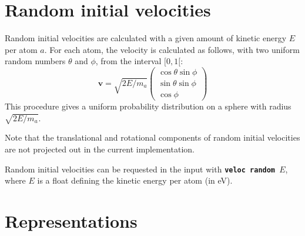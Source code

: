 \documentclass[a4paper,11pt,DIV=15,openany,twoside=false]{scrbook}
\newcommand{\sharc}{\textsc{Sharc}}
\newcommand{\ttt}[1]{\textbf{\texttt{#1}}}
\newcommand{\VEC}[1]{\ensuremath{\mathbf{#1}}}
\begin{document}
% 


\section{Random initial velocities}\label{met:veloc}

Random initial velocities are calculated with a given amount of kinetic energy $E$ per atom $a$. For each atom, the velocity is calculated as follows, with two uniform random numbers $\theta$ and $\phi$, from the interval $[0,1[$:
\begin{equation}
  \VEC{v}=\sqrt{2E/m_a}
  \begin{pmatrix}
    \cos{\theta}\sin{\phi}\\
    \sin{\theta}\sin{\phi}\\
    \cos{\phi}
  \end{pmatrix}
\end{equation}
This procedure gives a uniform probability distribution on a sphere with radius $\sqrt{2E/m_a}$.

Note that the translational and rotational components of random initial velocities are not projected out in the current implementation.

Random initial velocities can be requested in the input with \ttt{veloc random $E$}, where $E$ is a float defining the kinetic energy per atom (in eV).


\section{Representations}\label{sec:repr}
\end{document}
